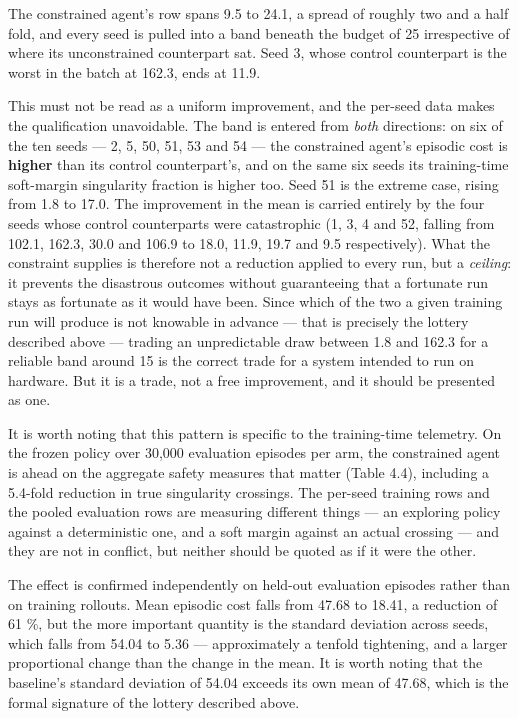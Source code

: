 The constrained agent's row spans 9.5 to 24.1, a spread of roughly two and a half fold, and every
seed is pulled into a band beneath the budget of 25 irrespective of where its unconstrained
counterpart sat. Seed 3, whose control counterpart is the worst in the batch at 162.3, ends at
11.9.

This must not be read as a uniform improvement, and the per-seed data makes the qualification
unavoidable. The band is entered from \emph{both} directions: on six of the ten seeds --- 2, 5, 50, 51,
53 and 54 --- the constrained agent's episodic cost is \textbf{higher} than its control counterpart's,
and on the same six seeds its training-time soft-margin singularity fraction is higher too. Seed
51 is the extreme case, rising from 1.8 to 17.0. The improvement in the mean is carried entirely
by the four seeds whose control counterparts were catastrophic (1, 3, 4 and 52, falling from
102.1, 162.3, 30.0 and 106.9 to 18.0, 11.9, 19.7 and 9.5 respectively). What the constraint
supplies is therefore not a reduction applied to every run, but a \emph{ceiling}: it prevents the
disastrous outcomes without guaranteeing that a fortunate run stays as fortunate as it would have
been. Since which of the two a given training run will produce is not knowable in advance --- that
is precisely the lottery described above --- trading an unpredictable draw between 1.8 and 162.3 for
a reliable band around 15 is the correct trade for a system intended to run on hardware. But it is
a trade, not a free improvement, and it should be presented as one.

It is worth noting that this pattern is specific to the training-time telemetry. On the frozen
policy over 30,000 evaluation episodes per arm, the constrained agent is ahead on the aggregate
safety measures that matter (Table 4.4), including a 5.4-fold reduction in true singularity
crossings. The per-seed training rows and the pooled evaluation rows are measuring different
things --- an exploring policy against a deterministic one, and a soft margin against an actual
crossing --- and they are not in conflict, but neither should be quoted as if it were the other.

The effect is confirmed independently on held-out evaluation episodes rather than on training
rollouts. Mean episodic cost falls from 47.68 to 18.41, a reduction of 61 \%, but the more important
quantity is the standard deviation across seeds, which falls from 54.04 to 5.36 --- approximately a
tenfold tightening, and a larger proportional change than the change in the mean. It is worth
noting that the baseline's standard deviation of 54.04 exceeds its own mean of 47.68, which is the
formal signature of the lottery described above.

